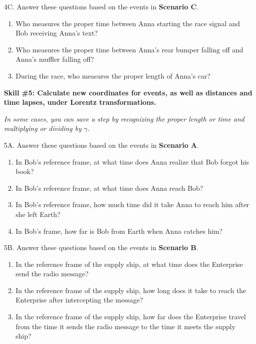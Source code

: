 4C. Answer these questions based on the events in \textbf{Scenario C}.
\begin{enumerate}[SkillBuilderParts]
\item Who measures the proper time between Anna starting the race signal and Bob receiving Anna's text?  
\answerspace{0.3in}

\item Who measures the proper time between Anna's rear bumper falling off and Anna's muffler falling off?
\answerspace{0.3in}

\item During the race, who measures the proper length of Anna's car?
\answerspace{0.3in}

\end{enumerate}

\pagebreak

\textbf{Skill \#5: Calculate new coordinates for events, as well as distances and time lapses, under Lorentz transformations.}

\textit{In some cases, you can save a step by recognizing the proper length or time and multiplying or dividing by $\gamma$.}

5A. Answer these questions based on the events in \textbf{Scenario A}.
\begin{enumerate}[SkillBuilderParts]
\item In Bob's reference frame, at what time does Anna realize that Bob forgot his book?
\answerspace{0.3in}

\item In Bob's reference frame, at what time does Anna reach Bob?
\answerspace{0.3in}

\item In Bob's reference frame, how much time did it take Anna to reach him after she left Earth?
\answerspace{0.3in}

\item In Bob's frame, how far is Bob from Earth when Anna catches him?
\answerspace{0.3in}

\end{enumerate}

5B. Answer these questions based on the events in \textbf{Scenario B}.
\begin{enumerate}[SkillBuilderParts]
\item In the reference frame of the supply ship, at what time does the Enterprise send the radio message?
\answerspace{0.3in}

\item In the reference frame of the supply ship, how long does it take to reach the Enterprise after intercepting the message?
\answerspace{0.3in}

\item In the reference frame of the supply ship, how far does the Enterprise travel from the time it sends the radio message to the time it meets the supply ship?
\answerspace{0.3in}
\end{enumerate}

